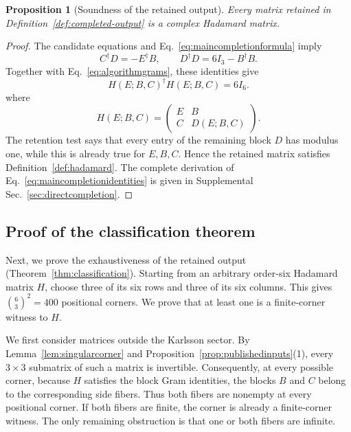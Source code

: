 \documentclass[aps,prx,reprint,nofootinbib,twoside,superscriptaddress,longbibliography,floatfix]{revtex4-2}
\newtheorem{proposition}[theorem]{Proposition}
\theoremstyle{definition}
\begin{document}
\begin{proposition}[Soundness of the retained output]
\label{prop:algorithmvalid}
Every matrix retained in Definition~\ref{def:completed-output} is a complex Hadamard matrix.
\end{proposition}

\begin{proof}
The candidate equations and Eq.~\eqref{eq:maincompletionformula} imply
\begin{equation}
C^{\dagger}D=-E^{\dagger}B,
\qquad
D^{\dagger}D=6I_3-B^{\dagger}B.
\label{eq:maincompletionidentities}
\end{equation}
Together with Eq.~\eqref{eq:algorithmgrams}, these identities give
\begin{equation}
H(E;B,C)^{\dagger}H(E;B,C)=6I_6.
\label{eq:mainoutputunitarity}
\end{equation}
where 
\begin{equation}
H(E;B,C)=
\begin{pmatrix}
E&B\\
C&D(E;B,C)
\end{pmatrix}.
\label{eq:algorithmoutputmatrix}
\end{equation}
The retention test says that every entry of the remaining block $D$ has modulus one, while this is already true for $E,B,C$. Hence the retained matrix satisfies Definition~\ref{def:hadamard}. The complete derivation of Eq.~\eqref{eq:maincompletionidentities} is given in Supplemental Sec.~\ref{sec:directcompletion}.
\end{proof}

\subsection{Proof of the classification theorem}

Next, we prove the exhaustiveness of the retained output (Theorem~\ref{thm:classification}). Starting from an arbitrary order-six Hadamard matrix $H$, choose three of its six rows and three of its six columns. This gives $\binom{6}{3}^2=400$ positional corners. We prove that at least one is a finite-corner witness to $H$.

We first consider matrices outside the Karlsson sector. By Lemma~\ref{lem:singularcorner} and Proposition~\ref{prop:publishedinputs}(1), every $3\times3$ submatrix of such a matrix is invertible. Consequently, at every possible corner, because $H$ satisfies the block Gram identities, the blocks $B$ and $C$ belong to the corresponding side fibers. Thus both fibers are nonempty at every positional corner. If both fibers are finite, the corner is already a finite-corner witness. The only remaining obstruction is that one or both fibers are infinite.
\end{document}
